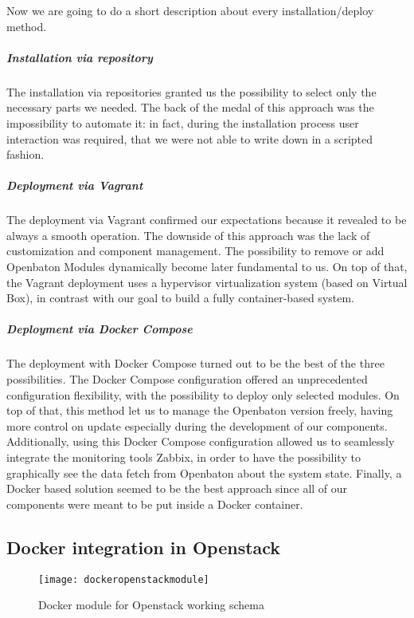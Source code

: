 Now we are going to do a short description about every installation/deploy method.

\subparagraph*{Installation via repository}
The installation via repositories granted us the possibility to select only the
necessary parts we needed. The back of the medal of this approach was the
impossibility to automate it: in fact, during the installation process user
interaction was required, that we were not able to write down in a scripted
fashion.

\subparagraph*{Deployment via Vagrant}
The deployment via Vagrant confirmed our expectations because it revealed to be
always a smooth operation. The downside of this approach was the lack of
customization and component management. The possibility to remove or add
Openbaton Modules dynamically become later fundamental to us. On top of that,
the Vagrant deployment uses a hypervisor virtualization system (based on Virtual
Box), in contrast with our goal to build a fully container-based system.

\subparagraph*{Deployment via Docker Compose}
The deployment with Docker Compose turned out to be the best of the three
possibilities. The Docker Compose configuration offered an unprecedented
configuration flexibility, with the possibility to deploy only selected modules.
On top of that, this method let us to manage the Openbaton version freely,
having more control on update especially during the development of our
components. Additionally, using this Docker Compose configuration allowed us to
seamlessly integrate the monitoring tools Zabbix, in order to have the
possibility to graphically see the data fetch from Openbaton about the system
state. Finally, a Docker based solution seemed to be the best approach since all
of our components were meant to be put inside a Docker container.

\subsection{Docker integration in Openstack}

\begin{figure}[t]
  \centering
  \texttt{[image: dockeropenstackmodule]}
  \caption[Docker module for Openstack working schema]{Docker module for
    Openstack working schema~\cite{openstackDockerModule}}
  \label{chap:archimpl:sec:fistattempt:img:dockeropnestackmodule}
\end{figure}

